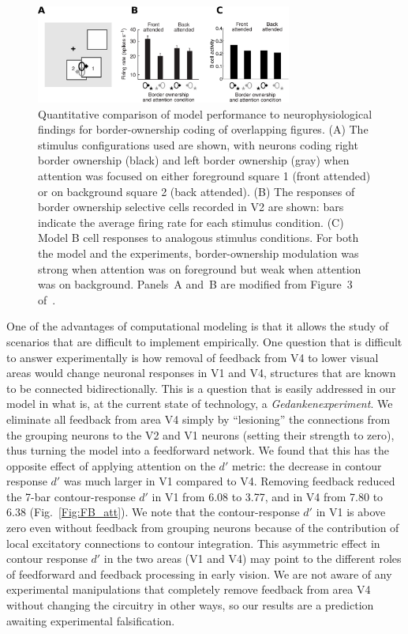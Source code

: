 \begin{figure}[htbp]
\centering
\includegraphics[width=0.75\textwidth]{Contour/figs/Fig7.eps}
\makeatletter
\let\@currsize\normalsize
\caption{Quantitative comparison of model performance to neurophysiological findings \citep{Qiu_etal07} for border-ownership coding of  overlapping figures. (A) The stimulus configurations used are shown, with neurons coding right border ownership (black) and left border ownership (gray) when attention was focused on either foreground square 1 (front attended) or on background square 2 (back attended). (B) The responses of border ownership selective cells recorded in V2 are shown:  bars indicate the average firing rate for each stimulus condition. (C) Model B cell responses to analogous stimulus conditions. For both the model and the experiments, border-ownership modulation was strong when attention was on foreground but weak when attention was on background. Panels~A and~B are modified from Figure~3 of~\cite{Qiu_etal07}.}
\label{Fig:Overlap_Square_exp_model}
\end{figure}

One of the advantages of computational modeling is that it allows the
study of scenarios that are difficult to implement empirically. One question that is difficult to answer experimentally is how removal of
feedback from V4 to lower visual areas would change neuronal responses in V1 and V4, structures that are known to be connected bidirectionally. This is a question that is easily addressed in our model in what is, at the current state of technology, a {\em Gedankenexperiment}. We eliminate all feedback from area V4 simply by ``lesioning'' the connections from the grouping neurons to the V2 and V1 neurons (setting their strength to zero), thus turning the model into a feedforward network.  We found that this has the opposite effect of applying attention on the $d'$ metric: the decrease in contour response $d'$ was much larger in V1 compared to V4. Removing feedback reduced the 7-bar contour-response $d'$ in V1 from 6.08 to 3.77, and
in V4 from 7.80 to 6.38 (Fig.~\ref{Fig:FB_att}). We note that the contour-response $d'$ in V1 is above zero even without feedback from
grouping neurons because of the contribution of local excitatory connections to contour integration. This asymmetric effect in contour response $d'$ in the two areas (V1 and V4) may point to the different roles of feedforward and feedback processing in early vision. We are not aware of any experimental manipulations that completely remove feedback from area V4 without changing the circuitry in other ways, so our results are a prediction awaiting experimental falsification.

